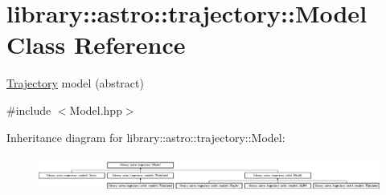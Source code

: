 \hypertarget{classlibrary_1_1astro_1_1trajectory_1_1_model}{}\section{library\+:\+:astro\+:\+:trajectory\+:\+:Model Class Reference}
\label{classlibrary_1_1astro_1_1trajectory_1_1_model}


\hyperlink{classlibrary_1_1astro_1_1_trajectory}{Trajectory} model (abstract)  




{\ttfamily \#include $<$Model.\+hpp$>$}

Inheritance diagram for library\+:\+:astro\+:\+:trajectory\+:\+:Model\+:\begin{figure}[H]
\begin{center}
\leavevmode
\includegraphics[height=1.166667cm]{classlibrary_1_1astro_1_1trajectory_1_1_model}
\end{center}
\end{figure}
